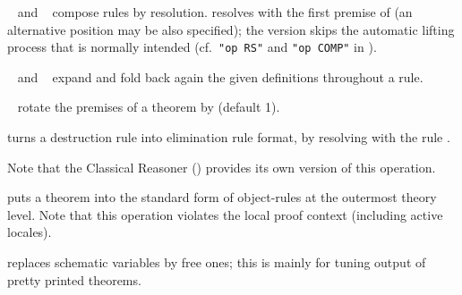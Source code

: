 \begin{isabellebody}
\begin{isamarkuptext}
\begin{descr}
  \item [\hyperlink{attribute.THEN}{\mbox{\isa{THEN}}}~\isa{a} and \hyperlink{attribute.COMP}{\mbox{\isa{COMP}}}~\isa{a}]
  compose rules by resolution.  \hyperlink{attribute.THEN}{\mbox{}} resolves with the
  first premise of  (an alternative position may be also
  specified); the \hyperlink{attribute.COMP}{\mbox{}} version skips the automatic
  lifting process that is normally intended (cf.\ \verb|"op RS"| and
  \verb|"op COMP"| in \cite[\S5]{isabelle-ref}).
  
  \item [\hyperlink{attribute.unfolded}{\mbox{\isa{unfolded}}}~\isa{{\isachardoublequote}a\isactrlsub {\isadigit{1}}\ {\isasymdots}\ a\isactrlsub n{\isachardoublequote}} and
  \hyperlink{attribute.folded}{\mbox{\isa{folded}}}~\isa{{\isachardoublequote}a\isactrlsub {\isadigit{1}}\ {\isasymdots}\ a\isactrlsub n{\isachardoublequote}}] expand and fold
  back again the given definitions throughout a rule.

  \item [\hyperlink{attribute.rotated}{\mbox{\isa{rotated}}}~\isa{n}] rotate the premises of a
  theorem by  (default 1).

  \item [\hyperlink{attribute.Pure.elim-format}{\mbox{\isa{elim{\isacharunderscore}format}}}] turns a destruction rule
  into elimination rule format, by resolving with the rule .
  
  Note that the Classical Reasoner () provides
  its own version of this operation.

  \item [\hyperlink{attribute.standard}{\mbox{\isa{standard}}}] puts a theorem into the standard form
  of object-rules at the outermost theory level.  Note that this
  operation violates the local proof context (including active
  locales).

  \item [\hyperlink{attribute.no-vars}{\mbox{\isa{no{\isacharunderscore}vars}}}] replaces schematic variables by free
  ones; this is mainly for tuning output of pretty printed theorems.


\end{descr}
\end{isamarkuptext}
\end{isabellebody}
